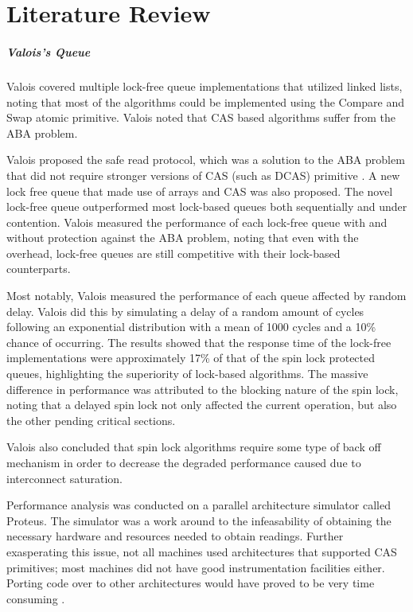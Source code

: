 \chapter{Literature Review}
\paragraph{Valois's Queue}
Valois covered multiple lock-free queue implementations that utilized linked lists, noting that most of the algorithms could be implemented using the Compare and Swap atomic primitive. Valois noted that CAS based algorithms suffer from the ABA problem. \cite{valois1994implementing}

Valois proposed the safe read protocol, which was a solution to the ABA problem that did not require stronger versions of CAS (such as DCAS) primitive \cite{valois1994implementing, valois1995lock}. A new lock free queue that made use of arrays and CAS was also proposed. The novel lock-free queue outperformed most lock-based queues both sequentially and under contention. Valois measured the performance of each lock-free queue with and without protection against the ABA problem, noting that even with the overhead, lock-free queues are still competitive with their lock-based counterparts.

Most notably, Valois measured the performance of each queue affected by random delay. Valois did this by simulating a delay of a random amount of cycles following an exponential distribution with a mean of 1000 cycles and a 10\% chance of occurring. The results showed that the response time of the lock-free implementations were approximately 17\% of that of the spin lock protected queues, highlighting the superiority of lock-based algorithms. The massive difference in performance was attributed to the blocking nature of the spin lock, noting that a delayed spin lock not only affected the current operation, but also the other pending critical sections.

Valois also concluded that spin lock algorithms require some type of back off mechanism in order to decrease the degraded performance caused due to interconnect saturation.

Performance analysis was conducted on a parallel architecture simulator called Proteus. The simulator was a work around to the infeasability of obtaining the necessary hardware and resources needed to obtain readings. Further exasperating this issue, not all machines used architectures that supported CAS primitives; most machines did not have good instrumentation facilities either. Porting code over to other architectures would have proved to be very time consuming \cite{valois1994implementing, valois1995lock}. 

